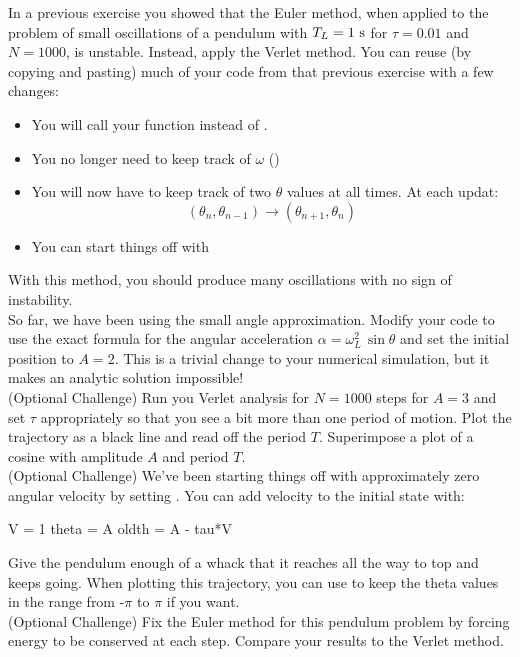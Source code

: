 \plot  In a previous exercise you showed that the Euler method, when applied to the problem of small oscillations of a pendulum with $T_L=1~\rm s$ for $\tau=0.01$ and $N=1000$, is unstable.  Instead, apply the Verlet method.  You can reuse (by copying and pasting) much of your code from that previous exercise with a few changes:
\begin{itemize}
 \item You will call your  function instead of .
 \item You no longer need to keep track of $\omega$ ()
 \item You will now have to keep track of two $\theta$ values at all times.  At each updat:
\begin{displaymath}
   (\theta_n, \theta_{n-1}) \rightarrow  (\theta_{n+1}, \theta_{n})
\end{displaymath}
 \item You can start things off with 
\end{itemize}
With this method, you should produce many oscillations with no sign of instability.\\

\plot So far, we have been using the small angle approximation.  Modify your code to use the exact formula for the angular acceleration $\alpha = \omega_L^2 \, \sin \theta$ and set the initial position to $A=2$.  This is a trivial change to your numerical simulation, but it  makes an analytic solution impossible!\\

\plot (Optional Challenge) Run you Verlet analysis for $N=1000$ steps
for $A=3$ and set $\tau$ appropriately so that you see a bit more than
one period of motion.  Plot the trajectory as a black line and read
off the period $T$.  Superimpose a plot of a cosine with amplitude $A$
and period $T$.\\

\plot (Optional Challenge) We've been starting things off with
approximately zero angular velocity by setting
.
You can add velocity to the initial state with:
\begin{python}
  V = 1
  theta = A
  oldth = A - tau*V
\end{python}
Give the pendulum enough of a whack that it reaches all the way to top
and keeps going.  When plotting this trajectory, you can use  to
keep the theta values in the range from -$\pi$ to $\pi$ if you want.\\

\plot (Optional Challenge) Fix the Euler method for this pendulum
problem by forcing energy to be conserved at each step.  Compare your
results to the Verlet method.\\















